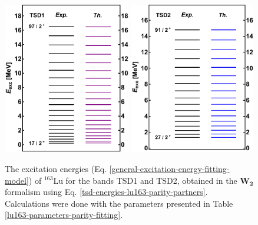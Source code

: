 \begin{figure}
    \centering
    \includegraphics[width=0.495\textwidth]{Chapters/Figures/parity-partners-plots/tsd1.pdf}
    \includegraphics[width=0.49\textwidth]{Chapters/Figures/parity-partners-plots/tsd2.pdf}
    \caption{The excitation energies (Eq. \ref{general-excitation-energy-fitting-model}) of $^{163}$Lu for the bands TSD1 and TSD2, obtained in the $\mathbf{W_2}$ formalism using Eq. \ref{tsd-energies-lu163-parity-partners}. Calculations were done with the parameters presented in Table \ref{lu163-parameters-parity-fitting}.}
    \label{results-parity-partners-163lu-1}
\end{figure}
